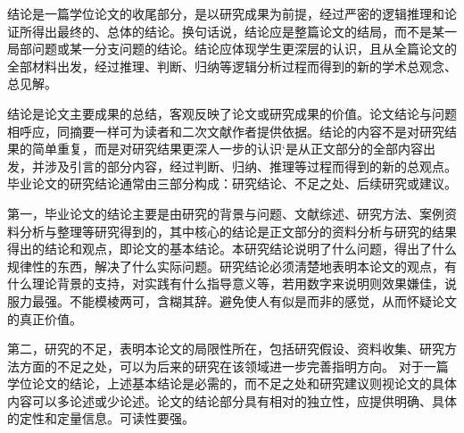 \reseachresult       %
结论是一篇学位论文的收尾部分，是以研究成果为前提，经过严密的逻辑推理和论证所得出最终的、总体的结论。换句话说，结论应是整篇论文的结局，而不是某一局部问题或某一分支问题的结论。结论应体现学生更深层的认识，且从全篇论文的全部材料出发，经过推理、判断、归纳等逻辑分析过程而得到的新的学术总观念、总见解。

结论是论文主要成果的总结，客观反映了论文或研究成果的价值。论文结论与问题相呼应，同摘要一样可为读者和二次文献作者提供依据。结论的内容不是对研究结果的简单重复，而是对研究结果更深人一步的认识‘是从正文部分的全部内容出发，并涉及引言的部分内容，经过判断、归纳、推理等过程而得到的新的总观点。毕业论文的研究结论通常由三部分构成：研究结论、不足之处、后续研究或建议。

第一，毕业论文的结论主要是由研究的背景与问题、文献综述、研究方法、案例资料分析与整理等研究得到的，其中核心的结论是正文部分的资料分析与研究的结果得出的结论和观点，即论文的基本结论。本研究结论说明了什么问题，得出了什么规律性的东西，解决了什么实际问题。研究结论必须淸楚地表明本论文的观点，有什么理论背景的支持，对实践有什么指导意义等，若用数字来说明则效果嫌佳，说服力最强。不能模棱两可，含糊其辞。避免使人有似是而非的感觉，从而怀疑论文的真正价值。 

第二，研究的不足，表明本论文的局限性所在，包括研究假设、资料收集、研究方法方面的不足之处，可以为后来的研究在该领域进一步完善指明方向。
对于一篇学位论文的结论，上述基本结论是必需的，而不足之处和研究建议则视论文的具体内容可以多论述或少论述。论文的结论部分具有相对的独立性，应提供明确、具体的定性和定量信息。可读性要强。

